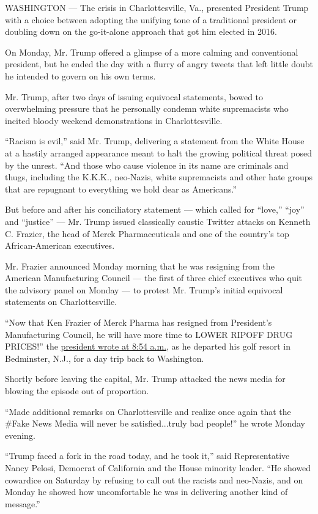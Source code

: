 WASHINGTON --- The crisis in Charlottesville, Va., presented President
Trump with a choice between adopting the unifying tone of a traditional
president or doubling down on the go-it-alone approach that got him
elected in 2016.

On Monday, Mr. Trump offered a glimpse of a more calming and
conventional president, but he ended the day with a flurry of angry
tweets that left little doubt he intended to govern on his own terms.

Mr. Trump, after two days of issuing equivocal statements, bowed to
overwhelming pressure that he personally condemn white supremacists who
incited bloody weekend demonstrations in Charlottesville.

``Racism is evil,'' said Mr. Trump, delivering a statement from the
White House at a hastily arranged appearance meant to halt the growing
political threat posed by the unrest. ``And those who cause violence in
its name are criminals and thugs, including the K.K.K., neo-Nazis, white
supremacists and other hate groups that are repugnant to everything we
hold dear as Americans.''

But before and after his conciliatory statement --- which called for
``love,'' ``joy'' and ``justice'' --- Mr. Trump issued classically
caustic Twitter attacks on Kenneth C. Frazier, the head of Merck
Pharmaceuticals and one of the country's top African-American
executives.

Mr. Frazier announced Monday morning that he was resigning from the
American Manufacturing Council --- the first of three chief executives
who quit the advisory panel on Monday --- to protest Mr. Trump's initial
equivocal statements on Charlottesville.

``Now that Ken Frazier of Merck Pharma has resigned from President's
Manufacturing Council, he will have more time to LOWER RIPOFF DRUG
PRICES!'' the
\href{https://twitter.com/realDonaldTrump/status/897079051277537280}{president
wrote at 8:54 a.m.}, as he departed his golf resort in Bedminster, N.J.,
for a day trip back to Washington.

Shortly before leaving the capital, Mr. Trump attacked the news media
for blowing the episode out of proportion.

``Made additional remarks on Charlottesville and realize once again that
the \#Fake News Media will never be satisfied...truly bad people!'' he
wrote Monday evening.

``Trump faced a fork in the road today, and he took it,'' said
Representative Nancy Pelosi, Democrat of California and the House
minority leader. ``He showed cowardice on Saturday by refusing to call
out the racists and neo-Nazis, and on Monday he showed how uncomfortable
he was in delivering another kind of message.''

